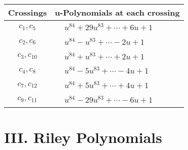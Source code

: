 \documentclass[1p]{elsarticle_modified}
\theoremstyle{definition}
\begin{document}
\begin{tabular}{m{50pt}|m{274pt}}
Crossings & \hspace{64pt}u-Polynomials at each crossing \\
\hline $$\begin{aligned}c_{1},c_{5}\end{aligned}$$&$\begin{aligned}
&u^{84}+29 u^{83}+\cdots+6 u+1
\end{aligned}$\\
\hline $$\begin{aligned}c_{2},c_{6}\end{aligned}$$&$\begin{aligned}
&u^{84}- u^{83}+\cdots-2 u+1
\end{aligned}$\\
\hline $$\begin{aligned}c_{3},c_{10}\end{aligned}$$&$\begin{aligned}
&u^{84}+u^{83}+\cdots+2 u+1
\end{aligned}$\\
\hline $$\begin{aligned}c_{4},c_{8}\end{aligned}$$&$\begin{aligned}
&u^{84}-5 u^{83}+\cdots-4 u+1
\end{aligned}$\\
\hline $$\begin{aligned}c_{7},c_{12}\end{aligned}$$&$\begin{aligned}
&u^{84}+5 u^{83}+\cdots+4 u+1
\end{aligned}$\\
\hline $$\begin{aligned}c_{9},c_{11}\end{aligned}$$&$\begin{aligned}
&u^{84}-29 u^{83}+\cdots-6 u+1
\end{aligned}$\\
\hline
\end{tabular}\newpage\renewcommand{\arraystretch}{1}
\centering \section*{ III. Riley Polynomials}
\end{document}
